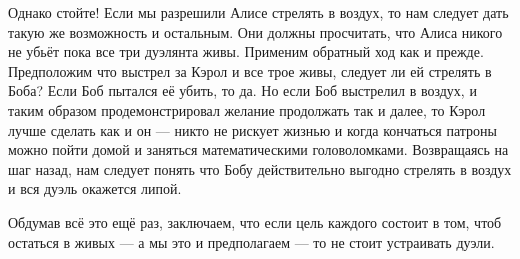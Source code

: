 Однако стойте!
Если мы разрешили Алисе стрелять в воздух, то нам следует дать такую же возможность и остальным. 
Они должны просчитать, что Алиса никого не убьёт пока все три дуэлянта живы. 
Применим обратный ход как и прежде.
Предположим что выстрел за Кэрол и все трое живы,
следует ли ей стрелять в Боба? 
Если Боб пытался её убить, то да.
Но если Боб выстрелил в воздух, и таким образом продемонстрировал желание продолжать так и далее,
то Кэрол лучше сделать как и он ---
никто не рискует жизнью и когда кончаться патроны можно пойти домой и заняться математическими головоломками.
Возвращаясь на шаг назад, нам следует понять что Бобу действительно выгодно стрелять в воздух и вся дуэль окажется липой.

Обдумав всё это ещё раз, заключаем, что если цель каждого состоит в том, чтоб остаться в живых --- а мы это и предполагаем --- то не стоит устраивать дуэли.
\heart


